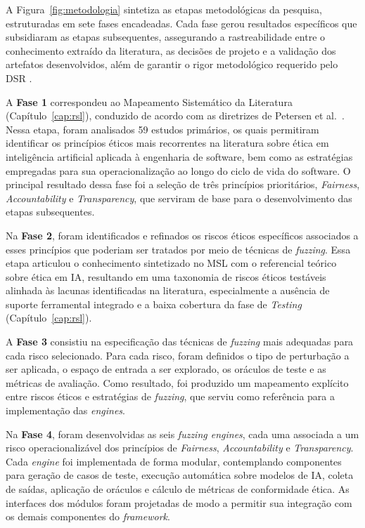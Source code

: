 A Figura~\ref{fig:metodologia} sintetiza as etapas metodológicas da pesquisa, estruturadas em sete fases encadeadas. Cada fase gerou resultados específicos que subsidiaram as etapas subsequentes, assegurando a rastreabilidade entre o conhecimento extraído da literatura, as decisões de projeto e a validação dos artefatos desenvolvidos, além de garantir o rigor metodológico requerido pelo DSR \cite{Hevner2004}.



A \textbf{Fase 1} correspondeu ao Mapeamento Sistemático da Literatura (Capítulo~\ref{cap:rsl}), conduzido de acordo com as diretrizes de Petersen et al.~\cite{Petersen2015}. Nessa etapa, foram analisados 59 estudos primários, os quais permitiram identificar os princípios éticos mais recorrentes na literatura sobre ética em inteligência artificial aplicada à engenharia de software, bem como as estratégias empregadas para sua operacionalização ao longo do ciclo de vida do software. O principal resultado dessa fase foi a seleção de três princípios prioritários, \textit{Fairness}, \textit{Accountability} e \textit{Transparency}, que serviram de base para o desenvolvimento das etapas subsequentes.

Na \textbf{Fase 2}, foram identificados e refinados os riscos éticos específicos associados a esses princípios que poderiam ser tratados por meio de técnicas de \textit{fuzzing}. Essa etapa articulou o conhecimento sintetizado no MSL com o referencial teórico sobre ética em IA, resultando em uma taxonomia de riscos éticos testáveis alinhada às lacunas identificadas na literatura, especialmente a ausência de suporte ferramental integrado e a baixa cobertura da fase de \textit{Testing} (Capítulo~\ref{cap:rsl}).

A \textbf{Fase 3} consistiu na especificação das técnicas de \textit{fuzzing} mais adequadas para cada risco selecionado. Para cada risco, foram definidos o tipo de perturbação a ser aplicada, o espaço de entrada a ser explorado, os oráculos de teste e as métricas de avaliação. Como resultado, foi produzido um mapeamento explícito entre riscos éticos e estratégias de \textit{fuzzing}, que serviu como referência para a implementação das \textit{engines}.

Na \textbf{Fase 4}, foram desenvolvidas as seis \textit{fuzzing engines}, cada uma associada a um risco operacionalizável dos princípios de \textit{Fairness}, \textit{Accountability} e \textit{Transparency}. Cada \textit{engine} foi implementada de forma modular, contemplando componentes para geração de casos de teste, execução automática sobre modelos de IA, coleta de saídas, aplicação de oráculos e cálculo de métricas de conformidade ética. As interfaces dos módulos foram projetadas de modo a permitir sua integração com os demais componentes do \textit{framework}.

